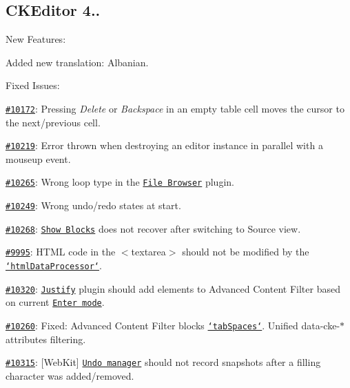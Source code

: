\subsection*{C\-K\-Editor 4..}

New Features\-:
\begin{DoxyItemize}
\item Added new translation\-: Albanian.
\end{DoxyItemize}

Fixed Issues\-:
\begin{DoxyItemize}
\item \href{http://dev.ckeditor.com/ticket/10172}{\tt \#10172}\-: Pressing {\itshape Delete} or {\itshape Backspace} in an empty table cell moves the cursor to the next/previous cell.
\item \href{http://dev.ckeditor.com/ticket/10219}{\tt \#10219}\-: Error thrown when destroying an editor instance in parallel with a {\ttfamily mouseup} event.
\item \href{http://dev.ckeditor.com/ticket/10265}{\tt \#10265}\-: Wrong loop type in the \href{http://ckeditor.com/addon/filebrowser}{\tt File Browser} plugin.
\item \href{http://dev.ckeditor.com/ticket/10249}{\tt \#10249}\-: Wrong undo/redo states at start.
\item \href{http://dev.ckeditor.com/ticket/10268}{\tt \#10268}\-: \href{http://ckeditor.com/addon/showblocks}{\tt Show Blocks} does not recover after switching to Source view.
\item \href{http://dev.ckeditor.com/ticket/9995}{\tt \#9995}\-: H\-T\-M\-L code in the {\ttfamily $<$textarea$>$} should not be modified by the \href{http://docs.ckeditor.com/#!/api/CKEDITOR.htmlDataProcessor}{\tt `html\-Data\-Processor`}.
\item \href{http://dev.ckeditor.com/ticket/10320}{\tt \#10320}\-: \href{http://ckeditor.com/addon/justify}{\tt Justify} plugin should add elements to Advanced Content Filter based on current \href{http://docs.ckeditor.com/#!/api/CKEDITOR.config-cfg-enterMode}{\tt Enter mode}.
\item \href{http://dev.ckeditor.com/ticket/10260}{\tt \#10260}\-: Fixed\-: Advanced Content Filter blocks \href{http://docs.ckeditor.com/#!/api/CKEDITOR.config-cfg-tabSpaces}{\tt `tab\-Spaces`}. Unified {\ttfamily data-\/cke-\/$\ast$} attributes filtering.
\item \href{http://dev.ckeditor.com/ticket/10315}{\tt \#10315}\-: \mbox{[}Web\-Kit\mbox{]} \href{http://docs.ckeditor.com/#!/api/CKEDITOR.plugins.undo.UndoManager}{\tt Undo manager} should not record snapshots after a filling character was added/removed.

\end{DoxyItemize}
